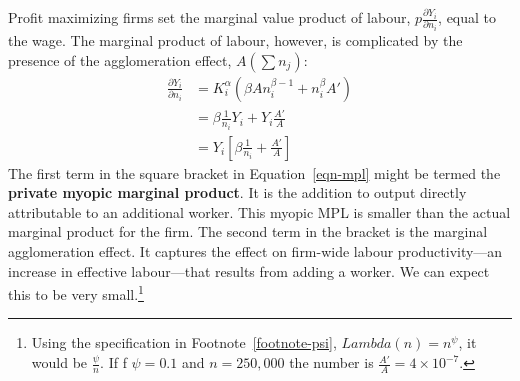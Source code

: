 
Profit maximizing firms  set the marginal value product of labour, $p\frac{\partial Y_i}{\partial n_i}$, equal to the wage. The marginal product of labour, however,  is complicated by the presence of the  agglomeration effect, $A(\sum n_j)$:
\begin{eqnarray} \frac{\partial Y_i}{\partial n_i} &=   K_i^\alpha \left(  \beta A n_i^{\beta-1}  + n_i^{\beta}A'  \right)  \nonumber\\
&=   \beta\frac{1}{n_i} Y_i   +  Y_i \frac{A'}{A}  \nonumber  \\
&=   Y_i  \left[  \beta\frac{1}{n_i}  + \frac{A' }{A} \right] \label{eqn-mpl}
\end{eqnarray}
The first term in the square bracket in Equation~\ref{eqn-mpl} might be termed the \textbf{private myopic marginal product}. It is the addition to output directly attributable to an additional worker. This myopic MPL is smaller than the actual marginal product for the firm.  
The second term in the bracket   is the marginal agglomeration effect. It captures the effect on firm-wide labour productivity---an increase in effective labour---that results from adding a worker. We can expect this to be very small.\footnote{Using the specification in Footnote~\ref{footnote-psi}, $Lambda(n)=n^\psi$, it would be $\frac{\psi}{n}$. If f $\psi=0.1$ and $n=250,000$ the number is $\frac{A' }{A} =4\times 10^{-7}$.}%


